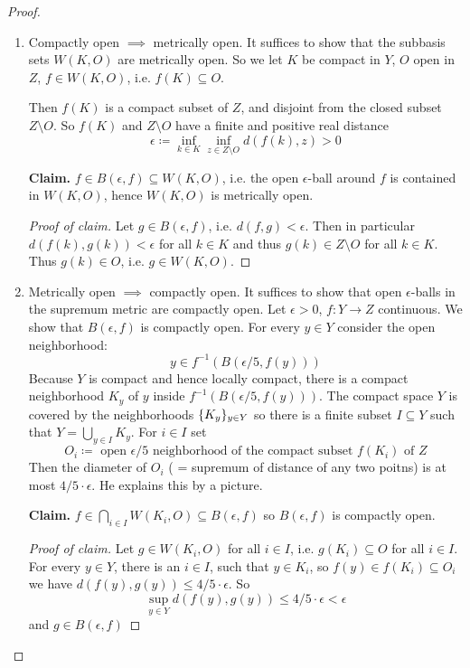 \documentclass[language=english]{TemplateLecture}
\begin{document}
\begin{proof}
    \begin{enumerate}
        \item Compactly open \(\implies\) metrically open. It suffices to show that the subbasis sets \(W(K,O)\) are metrically open.
        So we let \(K\) be compact in \(Y\), \(O\) open in \(Z\), \(f \in W(K,O)\), i.e. \(f(K) \subseteq O\).

        Then \(f(K)\) is a compact subset of \(Z\), and disjoint from the closed subset \(Z\setminus O\). So \(f(K)\) and \(Z\setminus O\) have a finite and positive real distance
        \[\epsilon\coloneq \inf_{k \in K} \inf_{z \in Z\setminus O} d(f(k), z) > 0\]
        
        \textbf{Claim.} \(f \in B(\epsilon, f) \subseteq W(K,O)\), i.e. the open \(\epsilon\)-ball around \(f\) is contained in \(W(K,O)\), hence \(W(K,O)\) is metrically open.
        \begin{proof}[Proof of claim]
            Let \(g \in B(\epsilon, f)\), i.e. \(d(f,g) < \epsilon\). Then in particular \(d(f(k), g(k)) < \epsilon\) for all \(k \in K\) and thus \(g(k) \in Z\setminus O\) for all \(k \in K\). Thus \(g(k) \in O\), i.e. \(g \in W(K,O)\).
        \end{proof}
        \item Metrically open \(\implies\) compactly open. It suffices to show that open \(\epsilon\)-balls in the supremum metric are compactly open. Let \(\epsilon> 0\), \(f\colon Y \to Z\) continuous. We show that \(B(\epsilon, f)\) is compactly open. For every \(y \in Y\) consider the open neighborhood:
        \[y \in f^{-1}(B(\epsilon/5, f(y)))\]
        Because \(Y\) is compact and hence locally compact, there is a compact neighborhood \(K_y\) of \(y\) inside \(f^{-1}(B(\epsilon/5, f(y)))\). The compact space \(Y\) is covered by the neighborhoods \(\{K_y\}_{y\in Y}\) so there is a finite subset \(I\subseteq Y\) such that \(Y = \bigcup_{y \in I} K_y\).
        For \(i \in I\) set
        \[O_i\coloneq \text { open } \epsilon/5 \text{ neighborhood of the compact subset } f(K_i) \text { of } Z\]
        Then the diameter of \(O_i\) ( = supremum of distance of any two poitns) is at most \(4/5 \cdot \epsilon\). He explains this by a picture.

        \textbf{Claim.} \(f \in \bigcap_{i \in I} W(K_i, O) \subseteq B(\epsilon, f)\) so \(B(\epsilon, f)\) is compactly open.
        \begin{proof}[Proof of claim]
            Let \(g \in W(K_i, O)\) for all \(i \in I\), i.e. \(g(K_i) \subseteq O\) for all \(i \in I\). For every \(y \in Y\), there is an \(i \in I\), such that \(y \in K_i\), so \(f(y) \in f(K_i) \subseteq O_i\) we have \(d(f(y), g(y)) \leq 4/5 \cdot \epsilon\). So
            \[\sup_{y\in Y} d(f(y), g(y)) \leq 4/5 \cdot \epsilon < \epsilon\]
            and \(g \in B(\epsilon, f)\)
        \end{proof}
    \end{enumerate}
\end{proof}
\end{document}
